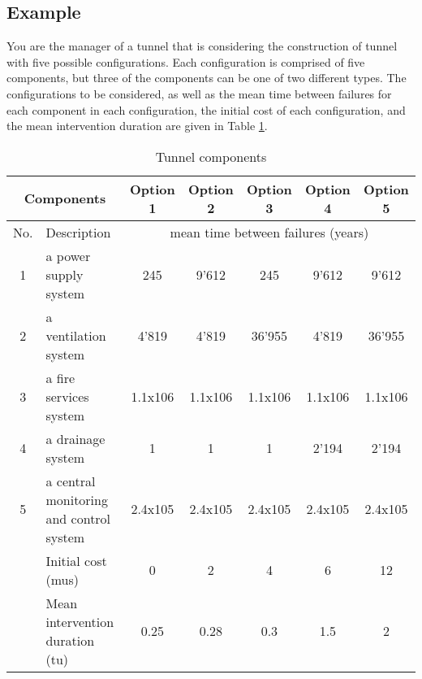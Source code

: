\subsection{Example}
You are the manager of a tunnel that is considering the construction of tunnel
with five possible configurations. Each configuration is comprised of five
components, but three of the components can be one of two different types. The
configurations to be considered, as well as the mean time between failures for
each component in each configuration, the initial cost of each configuration, and
the mean intervention duration are given in Table \ref{tblavaimain:3}.
\begin{table}[h]
\caption{Tunnel components}
\begin{tabular}{|l|l|l|l|l|l|l|}
\hline
\multicolumn{2}{|c|}{Components} & \multicolumn{1}{c|}{Option 1} & \multicolumn{1}{c|}{Option 2} & \multicolumn{1}{c|}{Option 3} & \multicolumn{1}{c|}{Option 4} & \multicolumn{1}{c|}{Option 5} \\ 
\hline
\multicolumn{1}{|c|}{No.} & Description & \multicolumn{5}{c|}{mean time between failures (years)} \\ 
\hline
\multicolumn{1}{|c|}{1} & a power supply system & \multicolumn{1}{c|}{245} & \multicolumn{1}{c|}{9'612} & \multicolumn{1}{c|}{245} & \multicolumn{1}{c|}{9'612} & \multicolumn{1}{c|}{9'612} \\ 
\hline
\multicolumn{1}{|c|}{2} & a ventilation system & \multicolumn{1}{c|}{4'819} & \multicolumn{1}{c|}{4'819} & \multicolumn{1}{c|}{36'955} & \multicolumn{1}{c|}{4'819} & \multicolumn{1}{c|}{36'955} \\ 
\hline
\multicolumn{1}{|c|}{3} & a fire services system & \multicolumn{1}{c|}{1.1x106} & \multicolumn{1}{c|}{1.1x106} & \multicolumn{1}{c|}{1.1x106} & \multicolumn{1}{c|}{1.1x106} & \multicolumn{1}{c|}{1.1x106} \\ 
\hline
\multicolumn{1}{|c|}{4} & a drainage system & \multicolumn{1}{c|}{1} & \multicolumn{1}{c|}{1} & \multicolumn{1}{c|}{1} & \multicolumn{1}{c|}{2'194} & \multicolumn{1}{c|}{2'194} \\ 
\hline
\multicolumn{1}{|c|}{5} & a central monitoring and control system & \multicolumn{1}{c|}{2.4x105} & \multicolumn{1}{c|}{2.4x105} & \multicolumn{1}{c|}{2.4x105} & \multicolumn{1}{c|}{2.4x105} & \multicolumn{1}{c|}{2.4x105} \\ 
\hline
\multicolumn{1}{|l}{} & Initial cost (mus) & \multicolumn{1}{c|}{0} & \multicolumn{1}{c|}{2} & \multicolumn{1}{c|}{4} & \multicolumn{1}{c|}{6} & \multicolumn{1}{c|}{12} \\ 
\hline
\multicolumn{1}{|l}{} & Mean intervention duration (tu) & \multicolumn{1}{c|}{0.25} & \multicolumn{1}{c|}{0.28} & \multicolumn{1}{c|}{0.3} & \multicolumn{1}{c|}{1.5} & \multicolumn{1}{c|}{2} \\ 
\hline
\end{tabular}
\label{tblavaimain:3}
\end{table}
